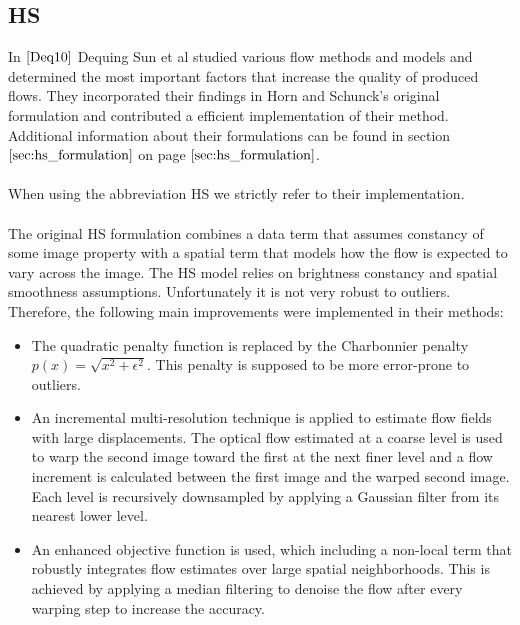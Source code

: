 \subsection{HS}
In $\cite{Deq10}$ Dequing Sun et al studied various flow methods and models and determined the most important factors that increase the quality of produced flows. They incorporated their findings in Horn and Schunck's original formulation and contributed a efficient implementation of their method. Additional information about their formulations can be found in section $\ref{sec:hs_formulation}$ on page $\pageref{sec:hs_formulation}$. \\ \\
When using the abbreviation HS we strictly refer to their implementation. \\ \\
The original HS formulation combines a data term that assumes constancy of some image property with a spatial term that models how the flow is expected to vary across the image. The HS model relies on brightness constancy and spatial smoothness assumptions. Unfortunately it is not very robust to outliers. Therefore, the following main improvements were implemented in their methods:
\begin{itemize}
  \item The quadratic penalty function is replaced by the Charbonnier penalty $p\left( x \right) = \sqrt{x^2 + \epsilon^2}$. This penalty is supposed to be more error-prone to outliers.
  \item An incremental multi-resolution technique is applied to estimate flow fields with large displacements. The optical flow estimated at a coarse level is used to warp the second image toward the first at the next finer level and a flow increment is calculated between the first image and the warped second image. Each level is recursively downsampled by applying a Gaussian filter from its nearest lower level.
  \item An enhanced objective function is used, which including a non-local term that robustly integrates flow estimates over large spatial neighborhoods. This is achieved by applying a median filtering to denoise the flow after every warping step to increase the accuracy.
\end{itemize}

